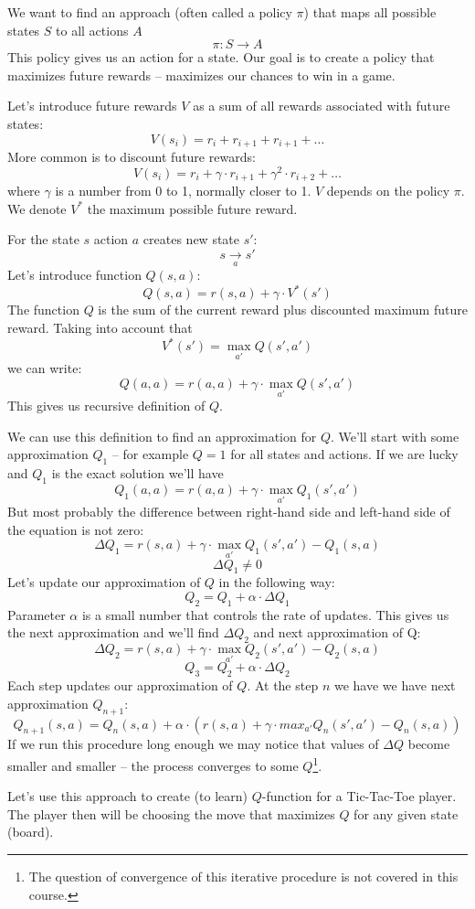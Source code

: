 We want to find an approach (often called a policy $\pi$) that
maps all possible states $S$ to all actions $A$
$$
\pi: S \rightarrow A
$$
This policy gives us an action for a state. Our goal is to
create a policy that maximizes future rewards -- maximizes
our chances to win in a game.

Let's introduce future rewards $V$ as a sum of all rewards
associated with future states:
$$
V(s_i) = r_i + r_{i+1} + r_{i+1} + \dots
$$
More common is to discount future rewards:
$$
V(s_i) = r_i + \gamma \cdot r_{i+1} + \gamma^2 \cdot r_{i+2} + \dots
$$
where $\gamma$ is a number from 0 to 1, normally closer to 1.
$V$ depends on the policy $\pi$. We denote $V^{*}$ the
maximum possible future reward.

For the state $s$ action $a$ creates new state $s'$:
$$
s \xrightarrow[a]{} s'
$$
Let's introduce function $Q(s,a)$:
$$
Q(s,a) = r(s,a) + \gamma\cdot V^{*}(s')
$$
The function $Q$ is the sum of the current reward plus
discounted maximum future reward.
Taking into account that 
$$V^{*}(s') = \max_{a'}Q(s',a')$$
we can write:
$$
Q(a,a) = r(a,a) + \gamma\cdot\max_{a'}Q(s',a')
$$
This gives us recursive definition of $Q$.

We can use this definition to find an approximation for $Q$.
We'll start with some approximation $Q_1$ -- for example
$Q = 1$ for all states and actions.
If we are lucky and $Q_1$ is the exact solution
we'll have
$$
Q_1(a,a) = r(a,a) + \gamma\cdot\max_{a'}Q_1(s',a')
$$
But most probably the difference between right-hand side
and left-hand side of the equation is not zero:
$$
\Delta Q_1 = r(s,a) + \gamma\cdot\max_{a'}Q_1(s',a') - Q_1(s,a) 
$$
$$
\Delta Q_1 \ne 0
$$
Let's update our approximation of $Q$ in the following way:
$$
Q_2 = Q_1 + \alpha\cdot\Delta Q_1
$$
Parameter $\alpha$ is a small number that controls the rate of updates.
This gives us the next approximation and we'll find $\Delta Q_2$ and next
approximation of Q:
$$
\Delta Q_2 = r(s,a) + \gamma\cdot\max_{a'}Q_2(s',a') - Q_2(s,a)
$$
$$
Q_3 = Q_2 + \alpha\cdot\Delta Q_2
$$
Each step updates our approximation of $Q$. At the step $n$ we have we
have next approximation $Q_{n+1}$:
$$
Q_{n+1}(s,a) = Q_n(s,a) + \alpha\cdot ( r(s,a) + \gamma\cdot max_{a'} Q_n(s',a') - Q_n(s,a) )
$$
If we run this procedure long enough we may notice that values of
$\Delta Q$ become smaller and smaller -- the process converges to some
$Q$\footnote{The question of convergence of this iterative procedure
is not covered in this course.}.

Let's use this approach to create (to learn) $Q$-function
for a Tic-Tac-Toe player. The player then will be choosing the move
that maximizes $Q$ for any given state (board).

